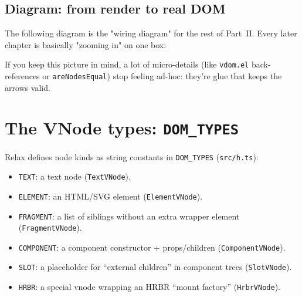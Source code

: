 \subsection*{Diagram: from render to real DOM}
The following diagram is the "wiring diagram" for the rest of Part~II. Every later chapter is basically "zooming in" on one box:

\begin{center}
\end{center}

If you keep this picture in mind, a lot of micro-details (like \texttt{vdom.el} back-references or \texttt{areNodesEqual}) stop feeling ad-hoc: they're glue that keeps the arrows valid.

\section{The VNode types: \texttt{DOM\_TYPES}}
Relax defines node kinds as string constants in \texttt{DOM\_TYPES} (\texttt{src/h.ts}):

\begin{itemize}
  \item \texttt{TEXT}: a text node (\texttt{TextVNode}).
  \item \texttt{ELEMENT}: an HTML/SVG element (\texttt{ElementVNode}).
  \item \texttt{FRAGMENT}: a list of siblings without an extra wrapper element (\texttt{FragmentVNode}).
  \item \texttt{COMPONENT}: a component constructor + props/children (\texttt{ComponentVNode}).
  \item \texttt{SLOT}: a placeholder for ``external children'' in component trees (\texttt{SlotVNode}).
  \item \texttt{HRBR}: a special vnode wrapping an HRBR ``mount factory'' (\texttt{HrbrVNode}).
\end{itemize}

